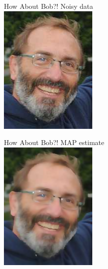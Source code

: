 \documentclass[10pt]{beamer}
\begin{document}

\begin{frame}{How About Bob?!}
\centering
Noisy data
\\
\includegraphics[height=40ex]{results/bob-tmp} 
\end{frame}
\begin{frame}{How About Bob?!}
\centering
MAP estimate\vphantom{y}
\\
\includegraphics[height=40ex]{results/bob-fixed}
\end{frame}
\end{document}
